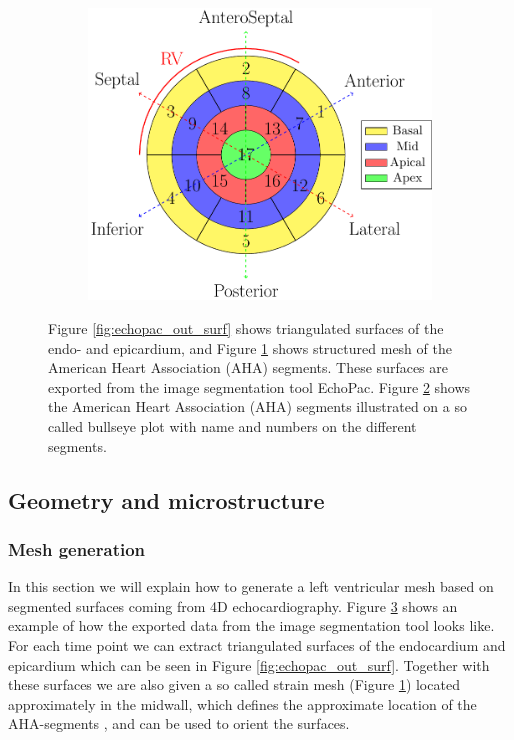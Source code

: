 \begin{figure}[htbp]
\begin{subfigure}[t]{0.3\textwidth}
    \caption{\label{fig:echopac_out_strain_mesh}}
  \end{subfigure}
  \begin{subfigure}[t]{0.38\textwidth}
    \includegraphics[width=\textwidth]{chapters/introduction/figures/bullseye/bullseye.pdf}
    \caption{\label{fig:bullseye_intro}}
  \end{subfigure}
\caption{Figure \ref{fig:echopac_out_surf} shows triangulated surfaces of the
      endo- and epicardium, and Figure
      \ref{fig:echopac_out_strain_mesh} shows structured mesh of the
      American Heart Association (AHA) segments. These surfaces are
      exported from the image segmentation tool EchoPac. Figure 
      \ref{fig:bullseye_intro} shows the American Heart Association (AHA)
      segments illustrated on a so called bullseye plot with name and
      numbers on the different segments. }
\label{fig:echopac_output}
\end{figure}


\subsection{Geometry and microstructure}


\subsubsection{Mesh generation}
In this section we will explain how to generate a left ventricular
mesh based on segmented surfaces coming from 4D echocardiography.
Figure \ref{fig:echopac_output} shows an example of how the exported data
from the image segmentation tool looks like. For each time point we
can extract triangulated surfaces of the endocardium and epicardium
which can be seen in Figure \ref{fig:echopac_out_surf}. Together with
these surfaces we are also given a so called strain mesh (Figure
\ref{fig:echopac_out_strain_mesh}) located approximately in the
midwall, which defines the approximate location of the AHA-segments
\cite{cerqueira2002standardized}, and can be used to orient the surfaces. 



